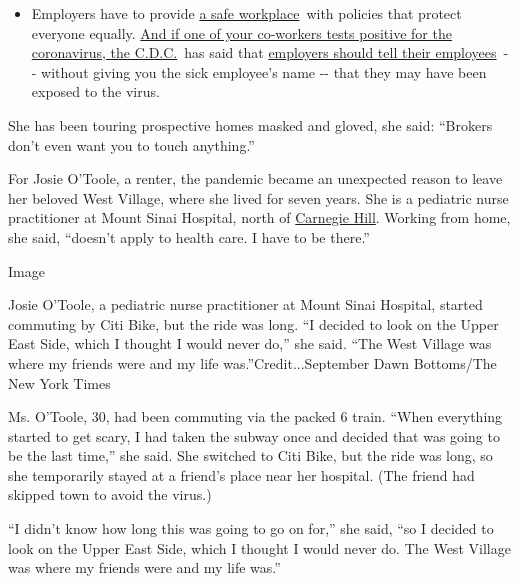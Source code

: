 \begin{itemize}
  \begin{itemize}
  \tightlist
  \item
    Employers have to provide
    \href{https://www.osha.gov/SLTC/covid-19/standards.html}{a safe
    workplace}~with policies that protect everyone equally.
    \href{https://www.nytimes3xbfgragh.onion/article/coronavirus-money-unemployment.html?action=click\&pgtype=Article\&state=default\&region=MAIN_CONTENT_3\&context=storylines_faq}{And
    if one of your co-workers tests positive for the coronavirus, the
    C.D.C.}~has said that
    \href{https://www.cdc.gov/coronavirus/2019-ncov/community/guidance-business-response.html}{employers
    should tell their employees}~-\/- without giving you the sick
    employee's name -\/- that they may have been exposed to the virus.
  \end{itemize}
\end{itemize}

She has been touring prospective homes masked and gloved, she said:
``Brokers don't even want you to touch anything.''

For Josie O'Toole, a renter, the pandemic became an unexpected reason to
leave her beloved West Village, where she lived for seven years. She is
a pediatric nurse practitioner at Mount Sinai Hospital, north of
\href{https://www.nytimes3xbfgragh.onion/2016/11/13/realestate/carnegie-hill-a-quiet-enclave-bordering-the-park.html}{Carnegie
Hill}. Working from home, she said, ``doesn't apply to health care. I
have to be there.''

Image

Josie O'Toole, a pediatric nurse practitioner at Mount Sinai Hospital,
started commuting by Citi Bike, but the ride was long. ``I decided to
look on the Upper East Side, which I thought I would never do,'' she
said. ``The West Village was where my friends were and my life
was.''Credit...September Dawn Bottoms/The New York Times

Ms. O'Toole, 30, had been commuting via the packed 6 train. ``When
everything started to get scary, I had taken the subway once and decided
that was going to be the last time,'' she said. She switched to Citi
Bike, but the ride was long, so she temporarily stayed at a friend's
place near her hospital. (The friend had skipped town to avoid the
virus.)

``I didn't know how long this was going to go on for,'' she said, ``so I
decided to look on the Upper East Side, which I thought I would never
do. The West Village was where my friends were and my life was.''

